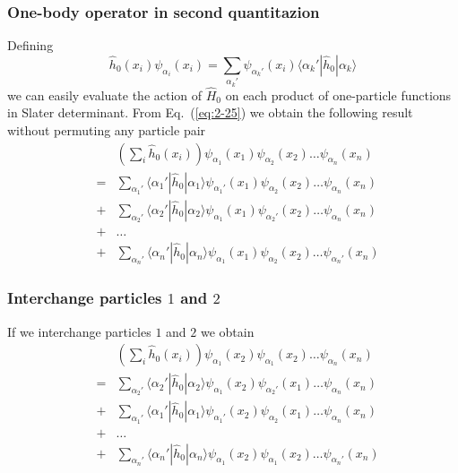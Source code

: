 \documentclass{beamer}
\begin{document}
\begin{frame}
\frametitle{One-body operator in second quantitazion}

Defining
\begin{equation}
	\hat{h}_0(x_i) \psi_{\alpha_i}(x_i) = \sum_{\alpha_k'} \psi_{\alpha_k'}(x_i) \langle\alpha_k'|\hat{h}_0|\alpha_k\rangle \label{eq:2-25}
\end{equation}
we can easily  evaluate the action of $\hat{H}_0$ on each product of one-particle functions in Slater determinant.
From Eq.~(\ref{eq:2-25})  we obtain the following result without  permuting any particle pair 
\begin{align}
	&& \left( \sum_i \hat{h}_0(x_i) \right) \psi_{\alpha_1}(x_1)\psi_{\alpha_2}(x_2) \dots \psi_{\alpha_n}(x_n) \nonumber \\
	& =&\sum_{\alpha_1'} \langle \alpha_1'|\hat{h}_0|\alpha_1\rangle 
		\psi_{\alpha_1'}(x_1)\psi_{\alpha_2}(x_2) \dots \psi_{\alpha_n}(x_n) \nonumber \\
	&+&\sum_{\alpha_2'} \langle \alpha_2'|\hat{h}_0|\alpha_2\rangle
		\psi_{\alpha_1}(x_1)\psi_{\alpha_2'}(x_2) \dots \psi_{\alpha_n}(x_n) \nonumber \\
	&+& \dots \nonumber \\
	&+&\sum_{\alpha_n'} \langle \alpha_n'|\hat{h}_0|\alpha_n\rangle
		\psi_{\alpha_1}(x_1)\psi_{\alpha_2}(x_2) \dots \psi_{\alpha_n'}(x_n) \label{eq:2-26}
\end{align}
\end{frame}

\begin{frame}
\frametitle{Interchange particles $1$ and $2$}

If we interchange particles $1$ and $2$  we obtain
\begin{align}
	&& \left( \sum_i \hat{h}_0(x_i) \right) \psi_{\alpha_1}(x_2)\psi_{\alpha_1}(x_2) \dots \psi_{\alpha_n}(x_n) \nonumber \\
	& =&\sum_{\alpha_2'} \langle \alpha_2'|\hat{h}_0|\alpha_2\rangle 
		\psi_{\alpha_1}(x_2)\psi_{\alpha_2'}(x_1) \dots \psi_{\alpha_n}(x_n) \nonumber \\
	&+&\sum_{\alpha_1'} \langle \alpha_1'|\hat{h}_0|\alpha_1\rangle
		\psi_{\alpha_1'}(x_2)\psi_{\alpha_2}(x_1) \dots \psi_{\alpha_n}(x_n) \nonumber \\
	&+& \dots \nonumber \\
	&+&\sum_{\alpha_n'} \langle \alpha_n'|\hat{h}_0|\alpha_n\rangle
		\psi_{\alpha_1}(x_2)\psi_{\alpha_1}(x_2) \dots \psi_{\alpha_n'}(x_n) \label{eq:2-27}
\end{align}
\end{frame}
\end{document}
